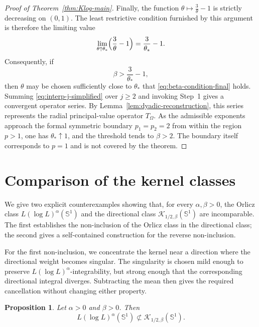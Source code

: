 \documentclass[11pt]{amsart}
\newtheorem{proposition}[definition]{Proposition}
\theoremstyle{remark}
\numberwithin{equation}{section}
\newcommand{\Sph}{\mathbb S^1}
\newcommand{\cK}{\mathcal K}
\begin{document}
\begin{proof}[Proof of Theorem~\ref{thm:Klog-main}]
		Finally, the function \(\theta\mapsto \frac3\theta-1\) is strictly decreasing
		on \((0,1)\).  The least restrictive condition furnished by this argument is
		therefore the limiting value
		\[
		\lim_{\theta\uparrow\theta_*}\Bigl(\frac3\theta-1\Bigr)
		=
		\frac3{\theta_*}-1.
		\]
		Consequently, if
		\begin{equation}\label{eq:beta-threshold-explicit}
			\beta>\frac3{\theta_*}-1,
		\end{equation}
		then \(\theta\) may be chosen sufficiently close to \(\theta_*\) that
		\eqref{eq:beta-condition-final} holds.  Summing
		\eqref{eq:interp-j-simplified} over \(j\ge2\) and invoking Step~1 gives a
		convergent operator series.  By Lemma~\ref{lem:dyadic-reconstruction}, this
		series represents the radial principal-value operator \(T_\Omega\). As the
		admissible exponents approach the formal
		symmetric boundary \(p_1=p_2=2\) from within the region \(p>1\), one has
		\(\theta_*\uparrow1\), and the threshold tends to \(\beta>2\). The boundary
		itself corresponds to \(p=1\) and is not covered by the theorem.
	\end{proof}
	\section{Comparison of the kernel classes}
	
	We give two explicit counterexamples showing that, for every \(\alpha,\beta>0\),
	the Orlicz class \(L(\log L)^\alpha(\Sph)\) and the directional class
	\(\cK_{1/2,\beta}(\Sph)\) are incomparable. The first establishes the
	non-inclusion of the Orlicz class in the directional class; the second gives a
	self-contained construction for the reverse non-inclusion.
	
	For the first non-inclusion, we concentrate the kernel near a direction where
	the directional weight becomes singular.  The singularity is chosen mild
	enough to preserve \(L(\log L)^\alpha\)-integrability, but strong enough that
	the corresponding directional integral diverges.  Subtracting the mean then
	gives the required cancellation without changing either property.
	
	\begin{proposition}\label{prop:Orlicz-not-Klog}
		Let \(\alpha>0\) and \(\beta>0\). Then
		\[
		L(\log L)^\alpha(\Sph)\not\subset \cK_{1/2,\beta}(\Sph).
		\]
	\end{proposition}
	
\end{document}
